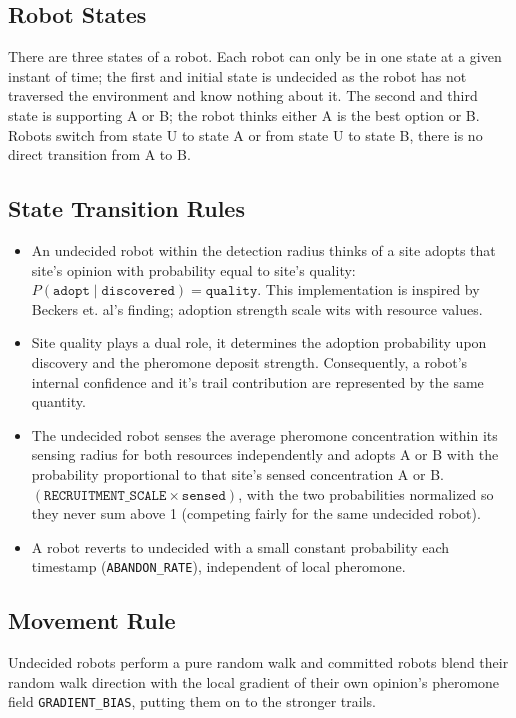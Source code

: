 \documentclass{article}
\begin{document}
\subsection{Robot States}
There are three states of a robot. Each robot can only be in one state at a given instant of time; the first and initial state is undecided as the robot has not traversed the environment and know nothing about it. The second and third state is supporting A or B; the robot thinks either A is the best option or B.  Robots switch from state U to state A or from state U to state B, there is no direct transition from A to B.
\subsection{State Transition Rules}
\begin{itemize}
    \item An undecided robot within the detection radius thinks of a site adopts 
that site's opinion with probability equal to site's quality: 
$P(\texttt{adopt} \mid \texttt{discovered}) = \texttt{quality}$. This implementation is inspired by Beckers et. al's finding; adoption strength scale wits with resource values.
    \item Site quality plays a dual role, it determines the adoption probability upon discovery and the pheromone deposit strength. Consequently, a robot's internal confidence and it's trail contribution are represented by the same quantity.
    \item The undecided robot senses the average pheromone concentration within its sensing radius for both resources independently and adopts A or B with the probability proportional to that site's sensed concentration A or B. $(\texttt{RECRUITMENT\_SCALE} \times \texttt{sensed})$, with the two probabilities normalized so they never sum above 1 (competing fairly for the same undecided robot).
    \item A robot reverts to undecided with a small constant probability each timestamp (\texttt{ABANDON\_RATE}), independent of local pheromone. 
\end{itemize}
\subsection{Movement Rule}
Undecided robots perform a pure random walk and committed robots blend their random walk direction with the local gradient of their own opinion's pheromone field \texttt{GRADIENT\_BIAS}, putting them on to the stronger trails. 
\end{document}
